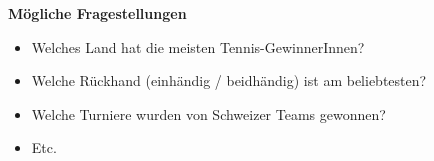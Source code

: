 \textbf{Mögliche Fragestellungen}
\begin{itemize}
\item Welches Land hat die meisten Tennis-GewinnerInnen?
\item Welche Rückhand (einhändig / beidhändig) ist am beliebtesten?
\item Welche Turniere wurden von Schweizer Teams gewonnen?
\item Etc.
\end{itemize}